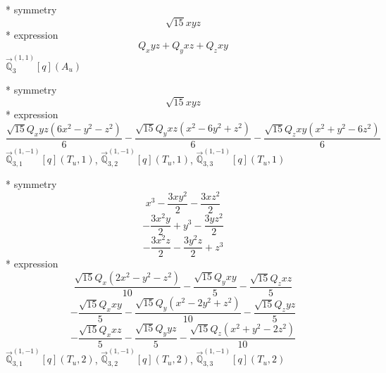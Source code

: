 \documentclass[fleqn,8pt]{jsarticle}
\begin{document}
\noindent\quad ** symmetry
\begin{dmath*}
\sqrt{15} x y z
\end{dmath*}
\noindent\quad ** expression
\begin{dmath*}
Q_{x} y z + Q_{y} x z + Q_{z} x y
\end{dmath*}
\noindent\quad $\vec{\mathbb{Q}}_{3}^{(1,1)}[q](A_{u})$

\noindent\quad ** symmetry
\begin{dmath*}
\sqrt{15} x y z
\end{dmath*}
\noindent\quad ** expression
\begin{dmath*}
\frac{\sqrt{15} Q_{x} y z \left(6 x^{2} - y^{2} - z^{2}\right)}{6} - \frac{\sqrt{15} Q_{y} x z \left(x^{2} - 6 y^{2} + z^{2}\right)}{6} - \frac{\sqrt{15} Q_{z} x y \left(x^{2} + y^{2} - 6 z^{2}\right)}{6}
\end{dmath*}
\noindent\quad $\vec{\mathbb{Q}}_{3,1}^{(1,-1)}[q](T_{u},1)$, $\vec{\mathbb{Q}}_{3,2}^{(1,-1)}[q](T_{u},1)$, $\vec{\mathbb{Q}}_{3,3}^{(1,-1)}[q](T_{u},1)$

\noindent\quad ** symmetry
\begin{dmath*}
x^{3} - \frac{3 x y^{2}}{2} - \frac{3 x z^{2}}{2}
\end{dmath*}
\begin{dmath*}
- \frac{3 x^{2} y}{2} + y^{3} - \frac{3 y z^{2}}{2}
\end{dmath*}
\begin{dmath*}
- \frac{3 x^{2} z}{2} - \frac{3 y^{2} z}{2} + z^{3}
\end{dmath*}
\noindent\quad ** expression
\begin{dmath*}
\frac{\sqrt{15} Q_{x} \left(2 x^{2} - y^{2} - z^{2}\right)}{10} - \frac{\sqrt{15} Q_{y} x y}{5} - \frac{\sqrt{15} Q_{z} x z}{5}
\end{dmath*}
\begin{dmath*}
- \frac{\sqrt{15} Q_{x} x y}{5} - \frac{\sqrt{15} Q_{y} \left(x^{2} - 2 y^{2} + z^{2}\right)}{10} - \frac{\sqrt{15} Q_{z} y z}{5}
\end{dmath*}
\begin{dmath*}
- \frac{\sqrt{15} Q_{x} x z}{5} - \frac{\sqrt{15} Q_{y} y z}{5} - \frac{\sqrt{15} Q_{z} \left(x^{2} + y^{2} - 2 z^{2}\right)}{10}
\end{dmath*}
\noindent\quad $\vec{\mathbb{Q}}_{3,1}^{(1,-1)}[q](T_{u},2)$, $\vec{\mathbb{Q}}_{3,2}^{(1,-1)}[q](T_{u},2)$, $\vec{\mathbb{Q}}_{3,3}^{(1,-1)}[q](T_{u},2)$
\end{document}
